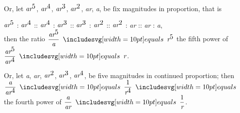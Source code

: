 \documentclass[12pt,preview]{standalone}
\begin{document}
\begin{minipage}{\textwidth}
    \hfill

    Or, let $\textit{ar}^{\text{\normalsize 5}}$, $\textit{ar}^{\text{\normalsize 4}}$, $\textit{ar}^{\text{\normalsize 3}}$, $\textit{ar}^{\text{\normalsize 2}}$, \textit{ar}, \textit{a}, be ſix magnitudes in proportion, that is

    \hfill

    \begin{center}
        $\textit{ar}^{\text{\normalsize 5}}$ : $\textit{ar}^{\text{\normalsize 4}}$ :: $\textit{ar}^{\text{\normalsize 4}}$ : $\textit{ar}^{\text{\normalsize 3}}$ :: $\textit{ar}^{\text{\normalsize 3}}$ : $\textit{ar}^{\text{\normalsize 2}}$ :: $\textit{ar}^{\text{\normalsize 2}}$ : \textit{ar} :: \textit{ar} : \textit{a},\\
        then the ratio $\dfrac{\textit{ar}^{\text{\normalsize 5}}}{\textit{a}} \bequals \textit{r}^{\text{\normalsize 5}}$ the fifth power of $\dfrac{\textit{ar}^{\text{\normalsize 5}}}{\textit{ar}^{\text{\normalsize 4}}} \bequals \textit{r}$.
    \end{center}

    \hfill

    Or, let \textit{a}, \textit{ar}, $\textit{ar}^{\text{\normalsize 2}}$, $\textit{ar}^{\text{\normalsize 3}}$, $\textit{ar}^{\text{\normalsize 4}}$, be five magnitudes in continued proportion; then $\dfrac{\textit{a}}{\textit{ar}^{\text{\normalsize 4}}} \bequals \dfrac{1}{\textit{r}^{\text{\normalsize 4}}} \bequals$ the fourth power of $\dfrac{\textit{a}}{\textit{ar}} \bequals \dfrac{1}{\textit{r}}$.

    \hfill

\end{minipage}
\end{document}
